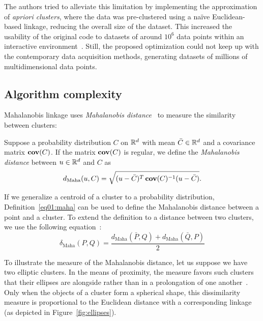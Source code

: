 The authors tried to alleviate this limitation by implementing the approximation of \emph{apriori clusters}, where the data was pre-clustered using a na\"{i}ve Euclidean-based linkage, reducing the overall size of the dataset. This increased the usability of the original code to datasets of around $10^6$ data points within an interactive environment~\cite{kratochvil2020shinysom}. Still, the proposed optimization could not keep up with the contemporary data acquisition methods, generating datasets of millions of multidimensional data points.

\subsection{Algorithm complexity}

Mahalanobis linkage uses \emph{Mahalanobis distance}~\cite{mahalanobis1936generalized} to measure the similarity between clusters:
\begin{defn}
    Suppose a probability distribution $C$ on $\mathbb{R}^d$ with mean $\bar{C} \in \mathbb{R}^d$ and a covariance matrix $\operatorname{\textbf{cov}}(C)$. If the matrix $\operatorname{\textbf{cov}}(C)$ is regular, we define the \emph{Mahalanobis distance} between $u \in \mathbb{R}^d$ and $C$ as
    \begin{equation}
    d_\text{Maha}(u,C) = \sqrt{(u-\bar{C})^T\operatorname{\textbf{cov}}(C)^{-1}(u-\bar{C})}.
    \end{equation}\label{eq01:maha}
\end{defn}

If we generalize a centroid of a cluster to a probability distribution, Definition~\ref{eq01:maha} can be used to define the Mahalanobis distance between a point and a cluster. To extend the definition to a distance between two clusters, we use the following equation~\cite{fivser2012detection}:
\begin{equation}
    \delta_\text{Maha}(P,Q) = \frac{d_\text{Maha}(\bar{P},Q) + d_\text{Maha}(\bar{Q},P)}{2}
\end{equation}\label{eq01:maha_linkage}

To illustrate the measure of the Mahalanobis distance, let us suppose we have two elliptic clusters. In the means of proximity, the measure favors such clusters that their ellipses are alongside rather than in a prolongation of one another~\cite{dagnelie1991using}.
Only when the objects of a cluster form a spherical shape, this dissimilarity measure is proportional to the Euclidean distance with a corresponding linkage (as depicted in Figure~\ref{fig:ellipses}).

